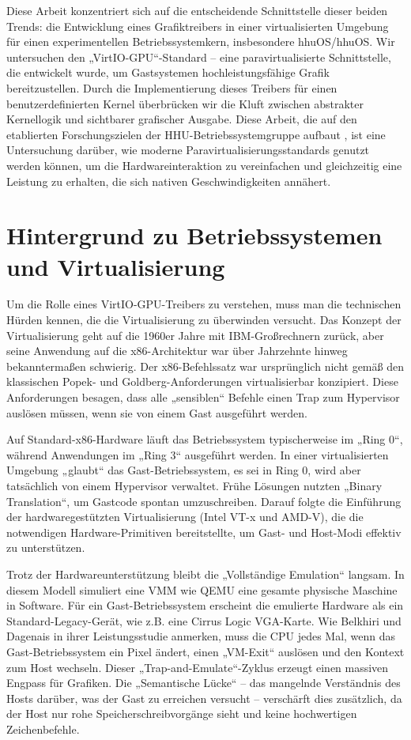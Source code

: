 Diese Arbeit konzentriert sich auf die entscheidende Schnittstelle dieser beiden Trends: die Entwicklung eines Grafiktreibers in einer virtualisierten Umgebung für einen experimentellen Betriebssystemkern, insbesondere hhuOS/hhuOS. Wir untersuchen den „VirtIO-GPU“-Standard – eine paravirtualisierte Schnittstelle, die entwickelt wurde, um Gastsystemen hochleistungsfähige Grafik bereitzustellen. Durch die Implementierung dieses Treibers für einen benutzerdefinierten Kernel überbrücken wir die Kluft zwischen abstrakter Kernellogik und sichtbarer grafischer Ausgabe. Diese Arbeit, die auf den etablierten Forschungszielen der HHU-Betriebssystemgruppe aufbaut \cite{Elrich2025}, ist eine Untersuchung darüber, wie moderne Paravirtualisierungsstandards genutzt werden können, um die Hardwareinteraktion zu vereinfachen und gleichzeitig eine Leistung zu erhalten, die sich nativen Geschwindigkeiten annähert.

\section{Hintergrund zu Betriebssystemen und Virtualisierung}
Um die Rolle eines VirtIO-GPU-Treibers zu verstehen, muss man die technischen Hürden kennen, die die Virtualisierung zu überwinden versucht. Das Konzept der Virtualisierung geht auf die 1960er Jahre mit IBM-Großrechnern zurück, aber seine Anwendung auf die x86-Architektur war über Jahrzehnte hinweg bekanntermaßen schwierig. Der x86-Befehlssatz war ursprünglich nicht gemäß den klassischen Popek- und Goldberg-Anforderungen virtualisierbar konzipiert. Diese Anforderungen besagen, dass alle „sensiblen“ Befehle einen Trap zum Hypervisor auslösen müssen, wenn sie von einem Gast ausgeführt werden.

Auf Standard-x86-Hardware läuft das Betriebssystem typischerweise im „Ring 0“, während Anwendungen im „Ring 3“ ausgeführt werden. In einer virtualisierten Umgebung „glaubt“ das Gast-Betriebssystem, es sei in Ring 0, wird aber tatsächlich von einem Hypervisor verwaltet. Frühe Lösungen nutzten „Binary Translation“, um Gastcode spontan umzuschreiben. Darauf folgte die Einführung der hardwaregestützten Virtualisierung (Intel VT-x und AMD-V), die die notwendigen Hardware-Primitiven bereitstellte, um Gast- und Host-Modi effektiv zu unterstützen.

Trotz der Hardwareunterstützung bleibt die „Vollständige Emulation“ langsam. In diesem Modell simuliert eine VMM wie QEMU eine gesamte physische Maschine in Software. Für ein Gast-Betriebssystem erscheint die emulierte Hardware als ein Standard-Legacy-Gerät, wie z.B. eine Cirrus Logic VGA-Karte. Wie Belkhiri und Dagenais in ihrer Leistungsstudie \cite{Belkhiri2024} anmerken, muss die CPU jedes Mal, wenn das Gast-Betriebssystem ein Pixel ändert, einen „VM-Exit“ auslösen und den Kontext zum Host wechseln. Dieser „Trap-and-Emulate“-Zyklus erzeugt einen massiven Engpass für Grafiken. Die „Semantische Lücke“ – das mangelnde Verständnis des Hosts darüber, was der Gast zu erreichen versucht – verschärft dies zusätzlich, da der Host nur rohe Speicherschreibvorgänge sieht und keine hochwertigen Zeichenbefehle.

